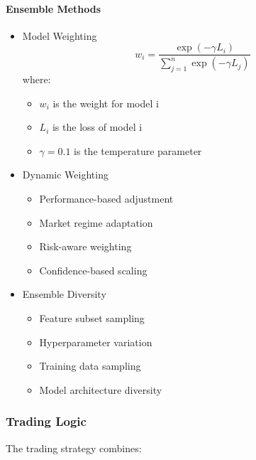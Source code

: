 \documentclass[conference]{IEEEtran}
\begin{document}
\paragraph{Ensemble Methods}
\begin{itemize}
    \item Model Weighting
    \begin{equation}
    w_i = \frac{\exp(-\gamma L_i)}{\sum_{j=1}^n \exp(-\gamma L_j)}
    \end{equation}
    where:
    \begin{itemize}
        \item $w_i$ is the weight for model i
        \item $L_i$ is the loss of model i
        \item $\gamma = 0.1$ is the temperature parameter
    \end{itemize}
    
    \item Dynamic Weighting
    \begin{itemize}
        \item Performance-based adjustment
        \item Market regime adaptation
        \item Risk-aware weighting
        \item Confidence-based scaling
    \end{itemize}
    
    \item Ensemble Diversity
    \begin{itemize}
        \item Feature subset sampling
        \item Hyperparameter variation
        \item Training data sampling
        \item Model architecture diversity
    \end{itemize}
\end{itemize}

\subsubsection{Trading Logic}
The trading strategy combines:
\end{document}
